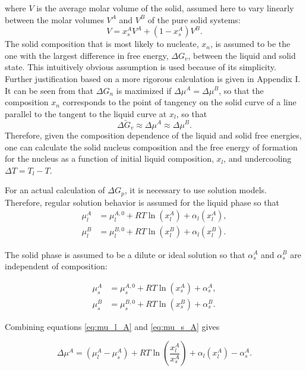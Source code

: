 where \(V\) is the average molar volume of the solid, assumed here to vary linearly between the molar volumes \(V^A\) and \(V^B\) of the pure solid systems:
\begin{equation}
V = x_s^A V^A + (1 - x_s^A) V^B. \label{eq:V}
\end{equation}
The solid composition that is most likely to nucleate, \(x_n\), is assumed to be the one with the largest difference in free energy, \(\Delta G_v\), between the liquid and solid state. This intuitively obvious assumption is used because of its simplicity. Further justification based on a more rigorous calculation is given in Appendix I. It can be seen from that \(\Delta G_n\) is maximized if \(\Delta \mu^A = \Delta \mu^B\), so that the composition \(x_n\) corresponds to the point of tangency on the solid curve of a line parallel to the tangent to the liquid curve at \(x_l\), so that
\begin{equation}
\bar{\Delta G_v} \approx \Delta \mu^A \approx \Delta \mu^B. \label{eq:bar_delta_G_v}
\end{equation}
Therefore, given the composition dependence of the liquid and solid free energies, one can calculate the solid nucleus composition and the free energy of formation for the nucleus as a function of initial liquid composition, \(x_l\), and undercooling \(\Delta T = T_l - T\).

For an actual calculation of \(\Delta G_p\), it is necessary to use solution models. Therefore, regular solution behavior is assumed for the liquid phase so that
\begin{align}
\mu_l^A &= \mu_l^{A,0} + RT \ln(x_l^A) + \alpha_l(x_l^A), \label{eq:mu_l_A} \\
\mu_l^B &= \mu_l^{B,0} + RT \ln(x_l^B) + \alpha_l(x_l^B). \label{eq:mu_l_B}
\end{align}

The solid phase is assumed to be a dilute or ideal solution so that \(\alpha_s^A\) and \(\alpha_s^B\) are independent of composition:

\begin{align}
\mu_s^A &= \mu_s^{A,0} + RT \ln(x_s^A) + \alpha_s^A, \label{eq:mu_s_A} \\
\mu_s^B &= \mu_s^{B,0} + RT \ln(x_s^B) + \alpha_s^B. \label{eq:mu_s_B}
\end{align}

Combining equations \eqref{eq:mu_l_A} and \eqref{eq:mu_s_A} gives

\begin{equation}
\Delta \mu^A = (\mu_l^{A} - \mu_s^{A}) + RT \ln\left(\frac{x_l^A}{x_s^A}\right) + \alpha_l(x_l^A) - \alpha_s^A. \label{eq:delta_mu_A_solution}
\end{equation}

